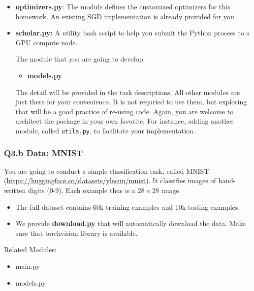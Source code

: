 \begin{itemize}
\item \textbf{optimizers.py}: The module defines the customized optimizers for this homework.
        An existing SGD implementation is already provided for you.

\item \textbf{scholar.py:} A utility bash script to help you submit the Python process to a GPU compute node.


The module that you are going to develop:
\begin{itemize}
\item \textbf{models.py}
\end{itemize}
The detail will be provided in the task descriptions. All other modules are just there for your convenience. It is not requried to use them, but exploring that will be a good practice of re-using code. Again, you are welcome to architect the package in your own favorite. For instance, adding another module, called \texttt{utils.py}, to facilitate your implementation.

\end{itemize}


\subsubsection*{Q3.b Data: MNIST}

You are going to conduct a simple classification task, called MNIST (\url{https://huggingface.co/datasets/ylecun/mnist}). It classifies images of hand-written digits (0-9). Each example thus is a \(28 \times 28\) image. 
\begin{itemize}
\item The full dataset contains 60k training examples and 10k testing examples.
\item We provide \textbf{download.py} that will automatically download the data. Make sure that torchvision library is available.
\end{itemize}


\noindent Related Modules: 
\begin{itemize}
\item main.py 
\item models.py
\end{itemize}


